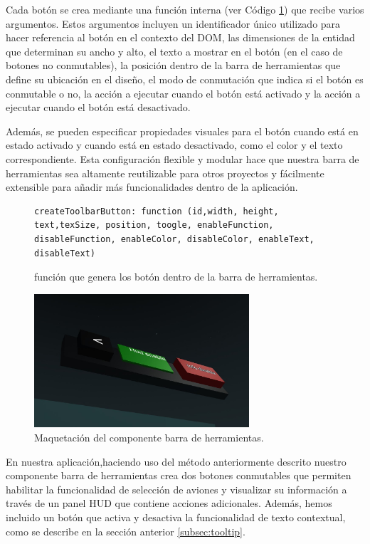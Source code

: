 \documentclass[a4paper, 11pt]{book}
\begin{document}
Cada botón se crea mediante una función interna (ver Código \ref{codigo:crearBoton}) que recibe varios argumentos. Estos argumentos incluyen un identificador único utilizado para hacer referencia al botón en el contexto del DOM, las dimensiones de la entidad que determinan su ancho y alto, el texto a mostrar en el botón (en el caso de botones no conmutables), la posición dentro de la barra de herramientas que define su ubicación en el diseño, el modo de conmutación que indica si el botón es conmutable o no, la acción a ejecutar cuando el botón está activado y la acción a ejecutar cuando el botón está desactivado.

Además, se pueden especificar propiedades visuales para el botón cuando está en estado activado y cuando está en estado desactivado, como el color y el texto correspondiente. Esta configuración flexible y modular hace que nuestra barra de herramientas sea altamente reutilizable para otros proyectos y fácilmente extensible para añadir más funcionalidades dentro de la aplicación.
\begin{figure}[h]
\centering
\begin{verbatim}
createToolbarButton: function (id,width, height, text,texSize, position, toogle, enableFunction, disableFunction, enableColor, disableColor, enableText, disableText)
\end{verbatim}
\caption{función que genera los botón dentro de la barra de herramientas.
\label{codigo:crearBoton}
}
\end{figure}
\begin{figure}[h]
  \centering
  \includegraphics[width=8cm, keepaspectratio]{img/toolbarElementos.jpg}
  \caption{Maquetación del componente barra de herramientas.}
  \label{fig:toolbarComposition}
\end{figure}

En nuestra aplicación,haciendo uso del método anteriormente descrito nuestro componente barra de herramientas crea dos botones conmutables que permiten habilitar la funcionalidad de selección de aviones y visualizar su información a través de un panel HUD que contiene acciones adicionales. Además, hemos incluido un botón que activa y desactiva la funcionalidad de texto contextual, como se describe en la sección anterior \ref{subsec:tooltip}.
\end{document}
